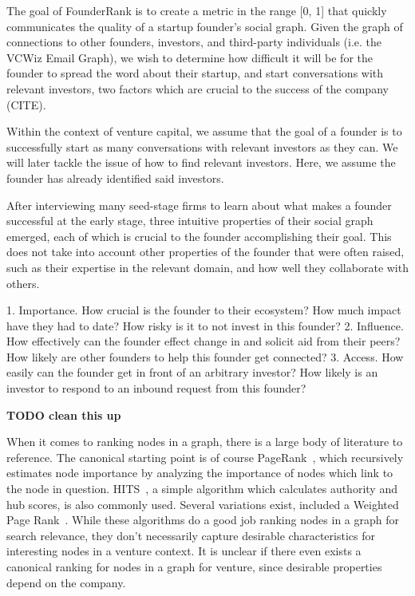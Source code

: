 The goal of FounderRank is to create a metric in the range [0, 1] that quickly communicates the quality of a startup founder's social graph. Given the graph of connections to other founders, investors, and third-party individuals (i.e. the VCWiz Email Graph), we wish to determine how difficult it will be for the founder to spread the word about their startup, and start conversations with relevant investors, two factors which are crucial to the success of the company (CITE).

Within the context of venture capital, we assume that the goal of a founder is to successfully start as many conversations with relevant investors as they can. We will later tackle the issue of how to find relevant investors. Here, we assume the founder has already identified said investors.

After interviewing many seed-stage firms to learn about what makes a founder successful at the early stage, three intuitive properties of their social graph emerged, each of which is crucial to the founder accomplishing their goal. This does not take into account other properties of the founder that were often raised, such as their expertise in the relevant domain, and how well they collaborate with others.

  1. Importance. How crucial is the founder to their ecosystem? How much impact have they had to date? How risky is it to not invest in this founder?
  2. Influence. How effectively can the founder effect change in and solicit aid from their peers? How likely are other founders to help this founder get connected?
  3. Access. How easily can the founder get in front of an arbitrary investor? How likely is an investor to respond to an inbound request from this founder?

\textbf{TODO clean this up}

When it comes to ranking nodes in a graph, there is a large body of literature to reference. The canonical starting point is of course PageRank~\cite{page1999pagerank}, which recursively estimates node importance by analyzing the importance of nodes which link to the node in question. HITS~\cite{kleinberg1999authoritative}, a simple algorithm which calculates authority and hub scores, is also commonly used. Several variations exist, included a Weighted Page Rank~\cite{xing2004weighted}. While these algorithms do a good job ranking nodes in a graph for search relevance, they don't necessarily capture desirable characteristics for interesting nodes in a venture context. It is unclear if there even exists a canonical ranking for nodes in a graph for venture, since desirable properties depend on the company.

